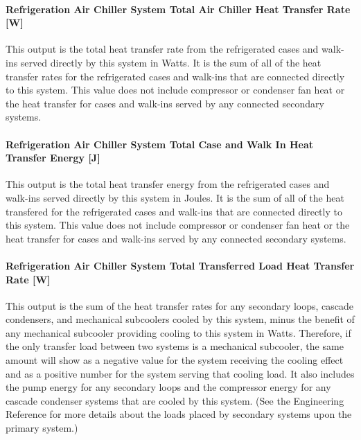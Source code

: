 \paragraph{Refrigeration Air Chiller System Total Air Chiller Heat Transfer Rate {[}W{]}}\label{refrigeration-air-chiller-system-total-air-chiller-heat-transfer-rate-w}

This output is the total heat transfer rate from the refrigerated cases and walk-ins served directly by this system in Watts. It is the sum of all of the heat transfer rates for the refrigerated cases and walk-ins that are connected directly to this system. This value does not include compressor or condenser fan heat or the heat transfer for cases and walk-ins served by any connected secondary systems.

\paragraph{Refrigeration Air Chiller System Total Case and Walk In Heat Transfer Energy {[}J{]}}\label{refrigeration-air-chiller-system-total-case-and-walk-in-heat-transfer-energy-j}

This output is the total heat transfer energy from the refrigerated cases and walk-ins served directly by this system in Joules. It is the sum of all of the heat transfered for the refrigerated cases and walk-ins that are connected directly to this system. This value does not include compressor or condenser fan heat or the heat transfer for cases and walk-ins served by any connected secondary systems.

\paragraph{Refrigeration Air Chiller System Total Transferred Load Heat Transfer Rate {[}W{]}}\label{refrigeration-air-chiller-system-total-transferred-load-heat-transfer-rate-w}

This output is the sum of the heat transfer rates for any secondary loops, cascade condensers, and mechanical subcoolers cooled by this system, minus the benefit of any mechanical subcooler providing cooling to this system in Watts. Therefore, if the only transfer load between two systems is a mechanical subcooler, the same amount will show as a negative value for the system receiving the cooling effect and as a positive number for the system serving that cooling load. It also includes the pump energy for any secondary loops and the compressor energy for any cascade condenser systems that are cooled by this system. (See the Engineering Reference for more details about the loads placed by secondary systems upon the primary system.)

